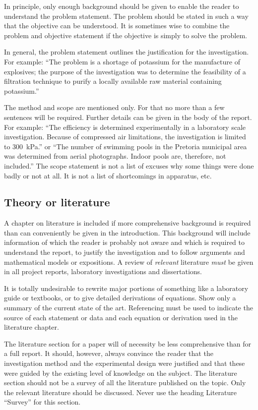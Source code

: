 \documentclass[a5paper, 10pt]{article}
\begin{document}
In principle, only enough background should be given to enable the
reader to understand the problem statement.  The problem should be
stated in such a way that the objective can be understood.  It is
sometimes wise to combine the problem and objective statement if the
objective is simply to solve the problem.

In general, the problem statement outlines the justification for the
investigation.  For example: ``The problem is a shortage of potassium
for the manufacture of explosives; the purpose of the investigation
was to determine the feasibility of a filtration technique to purify a
locally available raw material containing potassium.''

The method and scope are mentioned only.  For that no
more than a few sentences will be required.  Further details can be
given in the body of the report.  For example: ``The efficiency is
determined experimentally in a laboratory scale investigation.
Because of compressed air limitations, the investigation is limited to
\SI{300}{\kilo\pascal}.''  or ``The number of swimming pools in the Pretoria
municipal area was determined from aerial photographs.  Indoor pools
are, therefore, not included.''  The scope statement is not a
list of excuses why some things were done badly or not at all.  It is
not a list of shortcomings in apparatus, etc.

\subsection{Theory or literature}
\label{sec:literature}
A chapter on literature is included if more comprehensive background
is required than can conveniently be given in the introduction.  This
background will include information of which the reader is probably
not aware and which is required to understand the report, to justify
the investigation and to follow arguments and mathematical models or
expositions.  A review of \emph{relevant} literature \emph{must} be
given in all project reports, laboratory investigations and
dissertations.

It is totally undesirable to rewrite major portions of something like a
laboratory guide or textbooks, or to give detailed derivations of
equations.  Show only a summary of the current state of the art.
Referencing must be used to indicate the source of each statement or
data and each equation or derivation used in the literature chapter.

The literature section for a paper will of necessity be less
comprehensive than for a full report.  It should, however, always
convince the reader that the investigation method and the experimental
design were justified and that these were guided by the existing level
of knowledge on the subject.  The literature section should
not be a survey of all the literature published on the topic.  Only
the relevant literature should be discussed.  Never use the heading
Literature ``Survey'' for this section.
\end{document}
